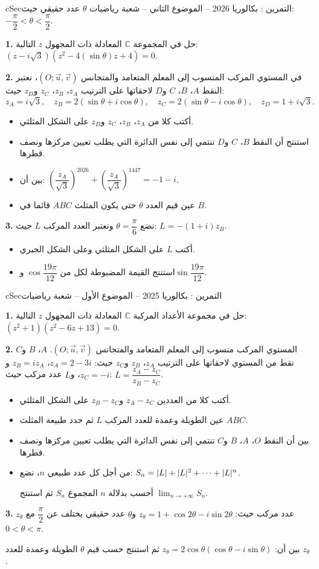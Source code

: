 \documentclass[12pt,a4paper]{article}
\newenvironment{BOX}[2]{\begin{otherlanguage}{english}\begin{arbox}{#1}{#2}}{\end{arbox}\end{otherlanguage}}
\newcounter{exo}
\newenvironment{tamrin}[1]{\stepcounter{exo}\begin{BOX}{cSec}{التمرين \theexo: #1}}{\end{BOX}}
\renewcommand{\cdots}{\mathinner{\cdotp\cdotp\cdotp}}
\newenvironment{sq}{\begin{itemize}[leftmargin=2.4em,itemsep=3pt]}{\end{itemize}}
\newcommand{\qa}{\item[(أ)]}\newcommand{\qb}{\item[(ب)]}\newcommand{\qc}{\item[(جـ)]}\newcommand{\qd}{\item[(د)]}\newcommand{\qe}{\item[(هـ)]}
\newcommand{\QQ}[1]{\par\smallskip\textbf{#1.} }
\begin{document}
\begin{tamrin}{بكالوريا 2026 -- الموضوع الثاني -- شعبة رياضيات}
$\theta$ عدد حقيقي حيث: $-\dfrac{\pi}{2}<\theta<\dfrac{\pi}{2}$.

\QQ{1} حل في المجموعة $\mathbb{C}$ المعادلة ذات المجهول $z$ التالية: $\left(z-i\sqrt3\right)\left(z^2-4(\sin\theta)z+4\right)=0$.

\QQ{2} في المستوي المركب المنسوب إلى المعلم المتعامد والمتجانس $\left(O;\vec u,\vec v\right)$، نعتبر النقط $A$، $B$، $C$ و$D$ لاحقاتها على الترتيب $z_A$، $z_B$، $z_C$ و$z_D$ حيث:
\[z_A=i\sqrt3,\quad z_B=2(\sin\theta+i\cos\theta),\quad z_C=2(\sin\theta-i\cos\theta),\quad z_D=1+i\sqrt3.\]
\begin{sq}
\qa أكتب كلا من $z_A$، $z_B$، $z_C$ و$z_D$ على الشكل المثلثي.
\qb استنتج أن النقط $B$، $C$ و$D$ تنتمي إلى نفس الدائرة التي يطلب تعيين مركزها ونصف قطرها.
\qc بين أن: $\left(\dfrac{z_A}{\sqrt3}\right)^{2026}+\left(\dfrac{z_A}{\sqrt3}\right)^{1447}=-1-i$.
\qd عين قيم العدد $\theta$ حتى يكون المثلث $ABC$ قائما في $B$.
\end{sq}
\QQ{3} نضع $\theta=\dfrac{\pi}{6}$ ونعتبر العدد المركب $L$ حيث: $L=-(1+i)z_B$.
\begin{sq}
\qa أكتب $L$ على الشكل المثلثي وعلى الشكل الجبري.
\qb استنتج القيمة المضبوطة لكل من $\cos\dfrac{19\pi}{12}$ و$\sin\dfrac{19\pi}{12}$.
\end{sq}
\end{tamrin}

\begin{tamrin}{بكالوريا 2025 -- الموضوع الأول -- شعبة رياضيات}
\QQ{1} حل في مجموعة الأعداد المركبة $\mathbb{C}$ المعادلة ذات المجهول $z$ التالية: $\left(z^2+1\right)\left(z^2-6z+13\right)=0$.

\QQ{2} المستوي المركب منسوب إلى المعلم المتعامد والمتجانس $\left(O;\vec u,\vec v\right)$.
$A$، $B$ و$C$ نقط من المستوي لاحقاتها على الترتيب $z_A$، $z_B$ و$z_C$ حيث: $z_A=2-3i$، $z_B=iz_A$ و$z_C=-i$،
و$L$ عدد مركب حيث: $L=\dfrac{z_A-z_C}{z_B-z_C}$.
\begin{sq}
\qa أكتب كلا من العددين $z_A-z_C$ و$z_B-z_C$ على الشكل المثلثي.
\qb عين الطويلة وعمدة للعدد المركب $L$ ثم حدد طبيعة المثلث $ABC$.
\qc بين أن النقط $O$، $A$، $B$ و$C$ تنتمي إلى نفس الدائرة التي يطلب تعيين مركزها ونصف قطرها.
\qd من أجل كل عدد طبيعي $n$، نضع: $S_n=|L|+|L|^2+\cdots+|L|^n$.

أحسب بدلالة $n$ المجموع $S_n$ ثم استنتج $\displaystyle\lim_{n\to+\infty}S_n$.
\end{sq}
\QQ{3} $z_\theta$ عدد مركب حيث: $z_\theta=1+\cos2\theta-i\sin2\theta$ و$\theta$ عدد حقيقي يختلف عن $\dfrac{\pi}{2}$ مع $0<\theta<\pi$.

بين أن: $z_\theta=2\cos\theta\left(\cos\theta-i\sin\theta\right)$ ثم استنتج حسب قيم $\theta$ الطويلة وعمدة للعدد $z_\theta$.
\end{tamrin}
\end{document}
